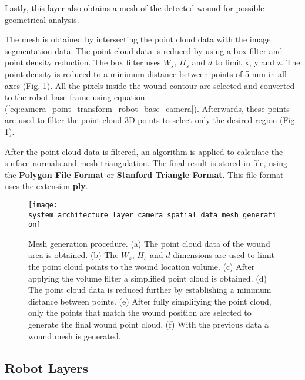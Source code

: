 Lastly, this layer also obtains a mesh of the detected wound for possible geometrical analysis.

The mesh is obtained by intersecting the point cloud data with the image segmentation data. The point cloud data is reduced by using a box filter and point density reduction. The box filter uses $W_s$, $H_s$ and $d$ to limit x, y and z. The point density is reduced to a minimum distance between points of 5 \si{\milli \meter} in all axes (Fig. \ref{fig:system_architecture_layer_camera_spatial_data_mesh_generation}). All the pixels inside the wound contour are selected and converted to the robot base frame using equation (\ref{eq:camera_point_transform_robot_base_camera}). Afterwards, these points are used to filter the point cloud 3D points to select only the desired region (Fig. \ref{fig:system_architecture_layer_camera_spatial_data_mesh_generation}).

After the point cloud data is filtered, an algorithm is applied to calculate the surface normals and mesh triangulation. The final result is stored in file, using the \textbf{Polygon File Format} or \textbf{Stanford Triangle Format}. This file format uses the extension \textbf{ply}.

\begin{figure}[htbp]
	\centering
	\texttt{[image: system\_architecture\_layer\_camera\_spatial\_data\_mesh\_generation]}
	\caption[Mesh generation procedure.]{Mesh generation procedure. (a) The point cloud data of the wound area is obtained. (b) The $W_s$, $H_s$ and $d$ dimensions are used to limit the point cloud points to the wound location volume. (c) After applying the volume filter a simplified point cloud is obtained. (d) The point cloud data is reduced further by establishing a minimum distance between points. (e) After fully simplifying the point cloud, only the points that match the wound position are selected to generate the final wound point cloud. (f) With the previous data a wound mesh is generated. }
	\label{fig:system_architecture_layer_camera_spatial_data_mesh_generation}
\end{figure}



\subsection{Robot Layers}
\label{subsec:system_architectural_robot_layers}

